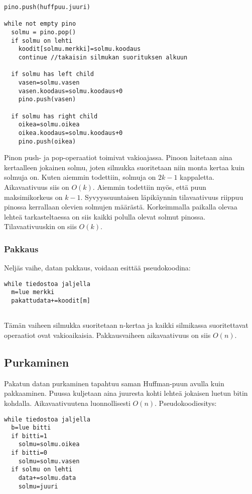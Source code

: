 \documentclass[a4paper, 12pt, finnish]{article}
\begin{document}
\begin{lstlisting}
pino.push(huffpuu.juuri)

while not empty pino
  solmu = pino.pop()
  if solmu on lehti
    koodit[solmu.merkki]=solmu.koodaus
    continue //takaisin silmukan suorituksen alkuun
  
  if solmu has left child
    vasen=solmu.vasen
    vasen.koodaus=solmu.koodaus+0
    pino.push(vasen)
  
  if solmu has right child
    oikea=solmu.oikea
    oikea.koodaus=solmu.koodaus+0
    pino.push(oikea)

\end{lstlisting}
Pinon push- ja pop-operaatiot toimivat vakioajassa. Pinoon laitetaan aina kertaalleen jokainen solmu, joten silmukka suoritetaan niin monta kertaa kuin solmuja on. Kuten aiemmin todettiin, solmuja on $2k-1$ kappaletta. Aikavaativuus siis on $O(k)$. Aiemmin todettiin myös, että puun maksimikorkeus on $k-1$. Syvyyssuuntaisen läpikäynnin tilavaativuus riippuu pinossa kerrallaan olevien solmujen määrästä. Korkeimmalla paikalla olevaa lehteä tarkasteltaessa on siis kaikki polulla olevat solmut pinossa. Tilavaativuuskin on siis $O(k)$.

\subsubsection{Pakkaus}
Neljäs vaihe, datan pakkaus, voidaan esittää pseudokoodina:

\begin{lstlisting}
while tiedostoa jaljella
  m=lue merkki
  pakattudata+=koodit[m]
	

\end{lstlisting}
Tämän vaiheen silmukka suoritetaan n-kertaa ja kaikki silmikassa suoritettavat operaatiot ovat vakioaikaisia. Pakkausvaiheen aikavaativuus on siis $O(n)$.

\subsection{Purkaminen}
Pakatun datan purkaminen tapahtuu saman Huffman-puun avulla kuin pakkaaminen. Puussa kuljetaan aina juuresta kohti lehteä jokaisen luetun bitin kohdalla. Aikavaativuutena luonnollisesti $O(n)$.
Pseudokoodiesitys:
\begin{lstlisting}
while tiedostoa jaljella
  b=lue bitti
  if bitti=1
    solmu=solmu.oikea
  if bitti=0
    solmu=solmu.vasen
  if solmu on lehti
    data+=solmu.data
    solmu=juuri

\end{lstlisting}
\end{document}
